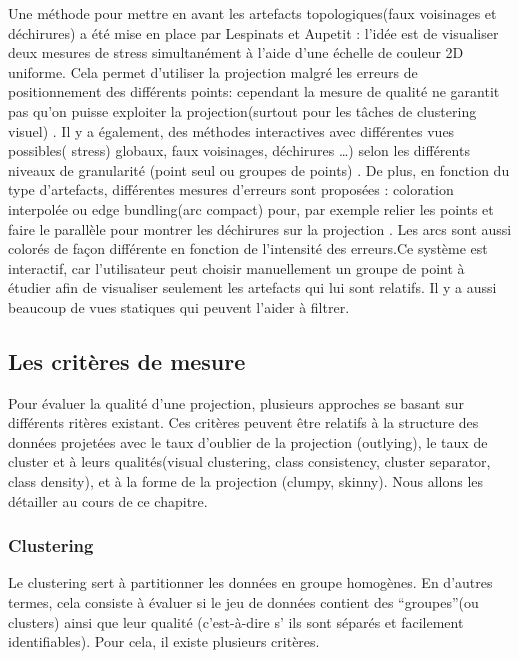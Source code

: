 Une méthode pour mettre en avant les artefacts topologiques(faux voisinages et déchirures) a été mise en place par Lespinats et Aupetit \cite{CheckViz} : l’idée est de visualiser deux mesures de stress simultanément à l’aide d’une échelle de couleur 2D uniforme. 
Cela permet d’utiliser la projection malgré les erreurs de positionnement des différents points: cependant la mesure de qualité ne garantit pas qu’on puisse exploiter la projection(surtout pour les tâches de clustering visuel) .
\newline
Il y a également, des méthodes interactives avec différentes vues
possibles( stress) globaux, faux voisinages, déchirures …) selon les différents niveaux de
granularité (point seul ou groupes de points) \cite{abbas2019clustme} \cite{HeulotThese}. De plus, en fonction du type d’artefacts,
différentes mesures d’erreurs sont proposées : coloration interpolée ou edge bundling(arc
compact) pour, par exemple relier les points et faire le parallèle pour montrer les déchirures
sur la projection \cite{holten2006-EDGE1} \cite{holten2011-EDGE2} \cite{HeulotThese}. Les arcs sont aussi colorés de façon différente en fonction de l’intensité
des erreurs.\newline Ce système est interactif, car l’utilisateur peut choisir manuellement un groupe de point à
étudier afin de visualiser seulement les artefacts qui lui sont relatifs. Il y a aussi beaucoup de
vues statiques qui peuvent l’aider à filtrer.

\subsection{Les critères de mesure}

Pour évaluer la qualité d’une projection, plusieurs approches se basant sur différents ritères existant.
Ces critères peuvent être relatifs à la structure des données projetées avec le taux d’oublier de la projection (outlying), le taux de cluster et à leurs qualités(visual clustering, class consistency, cluster separator, class density), et à la forme de la projection (clumpy, skinny).
Nous allons les détailler au cours de ce chapitre.

\subsubsection{Clustering}
Le clustering sert à partitionner les données en groupe homogènes. En d’autres termes, cela consiste à évaluer si le jeu de données contient des “groupes”(ou clusters) ainsi que leur qualité (c'est-à-dire s’ ils sont séparés et facilement identifiables).
Pour cela, il existe plusieurs critères.

